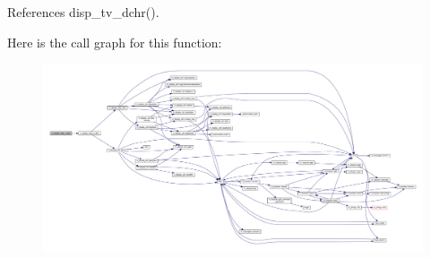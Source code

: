 References disp\+\_\+tv\+\_\+dchr().

Here is the call graph for this function\+:
\nopagebreak
\begin{figure}[H]
\begin{center}
\leavevmode
\includegraphics[width=350pt]{namespacem__display_a9be0f6a0bd57a08e389fe742311b7a02_cgraph}
\end{center}
\end{figure}
\mbox{\label{namespacem__display_ae5c96bc7b0b54e6e183431c31fa7ae80}} 
